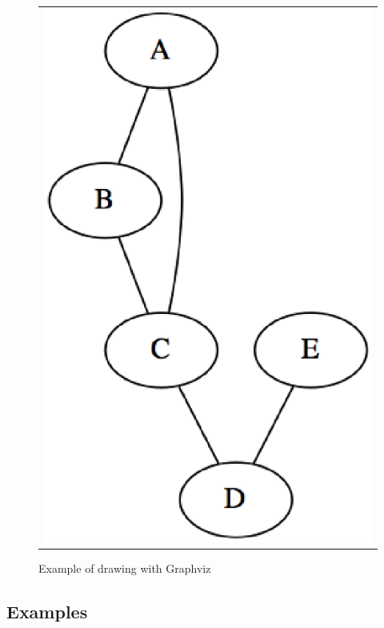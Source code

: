 \begin{figure}[htbp]
\begin{center}
\begin{tabular}{c}

\begin{minipage}{1.0\hsize}
\begin{center}
\includegraphics[scale=0.5]{figure/mgv0.eps}
\caption{Example of drawing with Graphviz \label{fig:mgv0}}
\end{center}
\end{minipage}

\end{tabular}
\end{center}
\end{figure}

\newpage
\subsection{Examples}


%

